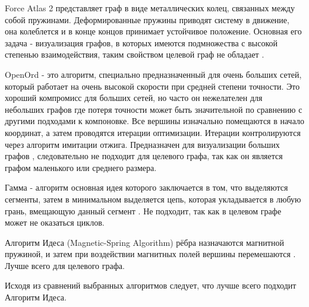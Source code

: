Force Atlas 2 представляет граф в виде металлических колец, связанных между собой пружинами. Деформированные пружины приводят систему в движение, она колеблется и в конце концов принимает устойчивое положение. Основная его задача - визуализация графов, в которых имеются подмножества с высокой степенью взаимодействия, таким свойством целевой граф не обладает \cite{alg-force-atlas-2}.

OpenOrd - это алгоритм, специально предназначенный для очень больших сетей, который работает на очень высокой скорости при средней степени точности. Это хороший компромисс для больших сетей, но часто он нежелателен для небольших графов где потеря точности может быть значительной по сравнению с другими подходами к компоновке. Все вершины изначально помещаются в начало координат, а затем проводятся итерации оптимизации. Итерации контролируются через алгоритм имитации отжига. Предназначен для визуализации больших графов \cite{alg-open-ord}, следовательно не подходит для целевого графа, так как он является графом маленького или среднего размера.

Гамма - алгоритм основная идея которого заключается в том, что выделяются сегменты, затем в минимальном выделяется цепь, которая укладывается в любую грань, вмещающую данный сегмент \cite{alg-gamma}. Не подходит, так как в целевом графе может не оказаться циклов.

Алгоритм Идеса (Magnetic-Spring Algorithm) рёбра назначаются магнитной пружиной, и затем при воздействии магнитных полей вершины перемешаются \cite{alg-eades}. Лучше всего для целевого графа.

Исходя из сравнений выбранных алгоритмов следует, что лучше всего подходит Алгоритм Идеса.

\noteattributes{}
